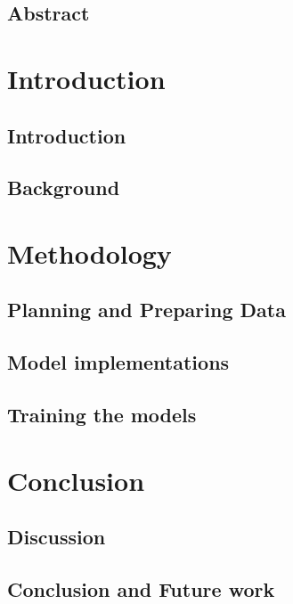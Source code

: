 \documentclass[UKenglish]{ifimaster}
\title{\problemStatement}
\subtitle{
}
\author{Joakim I. Frogner}
\begin{document}
\duoforside[dept={Department of Informatics},
program={Programming and Networks},
long]

\frontmatter{}
\chapter*{Abstract}

\tableofcontents{} 
\listoffigures{}
\listoftables{}

\mainmatter{}
\part{Introduction}

\chapter{Introduction}


\chapter{Background}



\part{Methodology}
\chapter{Planning and Preparing Data}


\chapter{Model implementations}


\chapter{Training the models}


\part{Conclusion}
\chapter{Discussion}


\chapter{Conclusion and Future work}


\backmatter{}
\printbibliography
\end{document}
